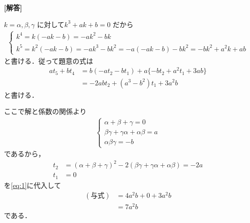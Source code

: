\documentclass[../../main.tex]{subfiles}
\begin{document}
\begin{oframed}
  
\end{oframed}

{\bf [解答]}

$k = \alpha, \beta, \gamma$ に対して$k^3 + ak + b = 0$ だから
\begin{align}
  \begin{cases}
    k^4 = k(-ak-b) = -ak^2 - bk \\
    k^5 = k^2(-ak-b) = -ak^3 - bk^2 = -a(-ak-b) - bk^2 = -bk^2 + a^2 k + ab
  \end{cases}
\end{align}
と書ける．従って題意の式は
\begin{align}
  a t_5 + b t_4
  &= b(-a t_2 - b t_1) + a \{-b t_2 + a^2 t_1 + 3ab\} \\
  &= -2ab t_2 + (a^3 - b^2) t_1 + 3a^2 b \label{eq:1}
\end{align}
と書ける．

ここで解と係数の関係より
\begin{align}
  \begin{cases}
    \alpha + \beta + \gamma = 0 \\
    \beta\gamma + \gamma\alpha + \alpha\beta = a \\
    \alpha\beta\gamma = -b
  \end{cases} \label{eq:2}
\end{align}
であるから，
\begin{align}
  t_2 &= (\alpha + \beta + \gamma)^2 - 2(\beta\gamma + \gamma\alpha + \alpha\beta) = -2a \\
  t_1 &= 0
\end{align}
を\cref{eq:1}に代入して
\begin{align}
  (\text{与式})
  &= 4a^2 b + 0 + 3a^2 b \\
  &= 7a^2 b
\end{align}
である．
\end{document}
